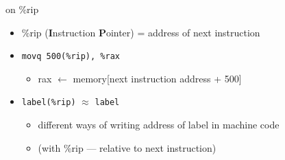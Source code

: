 
\begin{frame}{on \%rip}
    \begin{itemize}
        \item \%rip (\textbf{I}nstruction \textbf{P}ointer) = address of next instruction
        \item {\tt {\keywordstyle movq} 500(\%rip), \%rax}
            \begin{itemize}
                \item rax $\leftarrow$ memory[next instruction address + 500]
            \end{itemize}
        \item<2> {\tt label(\%rip)} $\approx$ {\tt label}
            \begin{itemize}
            \item different ways of writing address of label in machine code
            \item (with \%rip --- relative to next instruction)
            \end{itemize}
    \end{itemize}
\end{frame}

